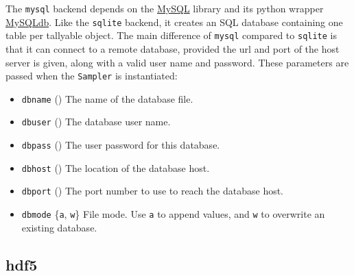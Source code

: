 The \texttt{mysql} backend depends on the \href{http://www.mysql.com/downloads/}{MySQL} library and its python wrapper
\href{http://sourceforge.net/projects/mysql-python}{MySQLdb}. Like the \texttt{sqlite} backend, it creates an SQL database containing
one table per tallyable object. The main difference of \texttt{mysql} compared to
\texttt{sqlite} is that it can connect to a remote database, provided the url and
port of the host server is given, along with a valid user name and password.
These parameters are passed when the \texttt{Sampler} is instantiated:
\begin{itemize}
\item {}
\texttt{dbname} () The name of the database file.

\item {}
\texttt{dbuser} () The database user name.

\item {}
\texttt{dbpass} () The user password for this database.

\item {}
\texttt{dbhost} () The location of the database host.

\item {}
\texttt{dbport} ()    The port number to use to reach the database host.

\item {}
\texttt{dbmode} {\{}\texttt{a}, \texttt{w}{\}} File mode.  Use \texttt{a} to append values, and \texttt{w}
to overwrite an existing database.

\end{itemize}
\begin{center}\begin{sffamily}
\end{sffamily}
\end{center}



\hypertarget{hdf5}{}
\subsection{hdf5}
\label{hdf5}


